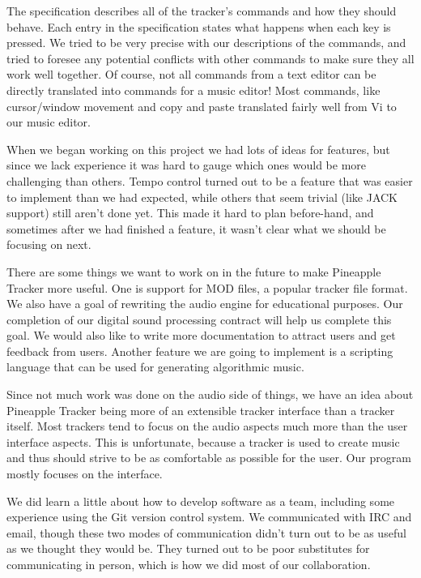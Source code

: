 \documentclass[12pt,letterpaper]{article}
\begin{document}
\par
The specification describes all of the tracker's commands and how they should behave.
Each entry in the specification states what happens when each key is pressed.
We tried to be very precise with our descriptions of the commands, and tried to foresee any potential conflicts with other commands to make sure they all work well together.
Of course, not all commands from a text editor can be directly translated into commands for a music editor!
Most commands, like cursor/window movement and copy and paste translated fairly well from Vi to our music editor.

\par
When we began working on this project we had lots of ideas for features, but since we lack experience it was hard to gauge which ones would be more challenging than others.
Tempo control turned out to be a feature that was easier to implement than we had expected, while others that seem trivial (like JACK support) still aren't done yet.
This made it hard to plan before-hand, and sometimes after we had finished a feature, it wasn't clear what we should be focusing on next.

\par
There are some things we want to work on in the future to make Pineapple Tracker more useful.
One is support for MOD files, a popular tracker file format.
We also have a goal of rewriting the audio engine for educational purposes.
Our completion of our digital sound processing contract will help us complete this goal.
We would also like to write more documentation to attract users and get feedback from users.
Another feature we are going to implement is a scripting language that can be used for generating algorithmic music.

\par
Since not much work was done on the audio side of things, we have an idea about Pineapple Tracker being more of an extensible tracker interface than a tracker itself. 
Most trackers tend to focus on the audio aspects much more than the user interface aspects.
This is unfortunate, because a tracker is used to create music and thus should strive to be as comfortable as possible for the user.
Our program mostly focuses on the interface.

\par
We did learn a little about how to develop software as a team, including some experience using the Git version control system.
We communicated with IRC and email, though these two modes of communication didn't turn out to be as useful as we thought they would be.
They turned out to be poor substitutes for communicating in person, which is how we did most of our collaboration.
\end{document}
